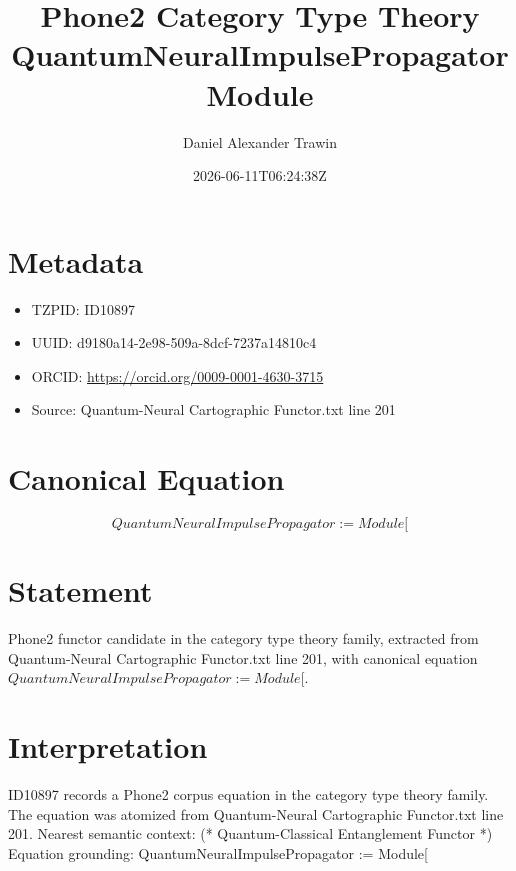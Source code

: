 \documentclass[11pt]{article}
\title{Phone2 Category Type Theory QuantumNeuralImpulsePropagator Module}
\author{Daniel Alexander Trawin}
\date{2026-06-11T06:24:38Z}
\begin{document}
\maketitle
\section*{Metadata}
\begin{itemize}
\item TZPID: ID10897
\item UUID: d9180a14-2e98-509a-8dcf-7237a14810c4
\item ORCID: \url{https://orcid.org/0009-0001-4630-3715}
\item Source: Quantum-Neural Cartographic Functor.txt line 201
\end{itemize}
\section*{Canonical Equation}
\[
QuantumNeuralImpulsePropagator := Module[
\]
\section*{Statement}
Phone2 functor candidate in the category type theory family, extracted from Quantum-Neural Cartographic Functor.txt line 201, with canonical equation $QuantumNeuralImpulsePropagator := Module[$.
\section*{Interpretation}
ID10897 records a Phone2 corpus equation in the category type theory family. The equation was atomized from Quantum-Neural Cartographic Functor.txt line 201. Nearest semantic context: (* Quantum-Classical Entanglement Functor *) Equation grounding: QuantumNeuralImpulsePropagator := Module[
\end{document}
